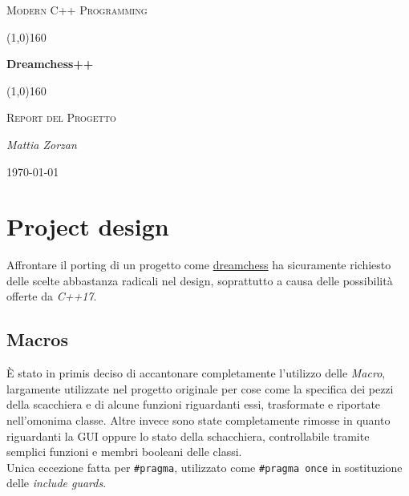 \documentclass{article}
\begin{document}
    \clearpage

    \begin{titlepage}
        \centering
        \vspace*{\fill}
        {\scshape\LARGE Modern C++ Programming \par}
        \vspace{1.5cm}
        \line(1,0){160} \\
        {\huge\bfseries Dreamchess++ \par}
        \line(1,0){160} \\
        \vspace{0.5cm}
        {\scshape\LARGE Report del Progetto \par}
        \vspace{2cm}
        {\Large\itshape Mattia Zorzan \par}
        \vspace{1cm}

        \vspace{5cm}
        \vspace*{\fill}
        {\large \today \par}
    \end{titlepage}
    \thispagestyle{empty}
    \newpage
    \tableofcontents
    \thispagestyle{empty}
    \newpage
    \section{Project design}\label{sec:design}
        Affrontare il porting di un progetto come \href{https://github.com/dreamchess/dreamchess}{dreamchess} ha sicuramente richiesto delle scelte abbastanza radicali nel design, soprattutto a causa delle possibilità offerte da \textit{C++17}.
        \subsection{Macros}\label{subsec:macros}
            È stato in primis deciso di accantonare completamente l'utilizzo delle \textit{Macro}, largamente utilizzate nel progetto originale per cose come la specifica dei pezzi della scacchiera e di alcune funzioni riguardanti essi, trasformate e riportate nell'omonima classe.
            Altre invece sono state completamente rimosse in quanto riguardanti la GUI oppure lo stato della schacchiera, controllabile tramite semplici funzioni e membri booleani delle classi.\\
            Unica eccezione fatta per \texttt{\#pragma}, utilizzato come \texttt{\#pragma once} in sostituzione delle \textit{include guards}.
\end{document}
